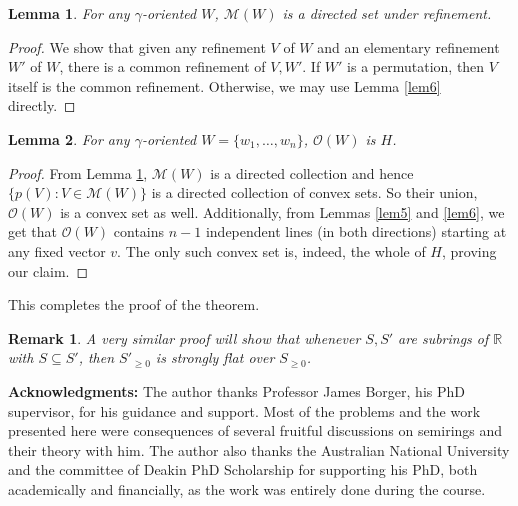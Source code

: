\documentclass[notitlepage, 10pt]{article}
\theoremstyle{defin}
\theoremstyle{theo}
\newtheorem{lem}{Lemma}[defn]
\theoremstyle{rema}
\newtheorem{rem}{Remark}[section]
\newcommand{\R}{\mathbb{R}}
\newcommand{\cM}{\mathcal{M}}
\newcommand{\cO}{\mathcal{O}}
\begin{document}
\begin{lem}
\label{lem7}
    For any $\gamma$-oriented $W$, $\cM(W)$ is a directed set under refinement.
\end{lem}

\begin{proof}
    We show that given any refinement $V$ of $W$ and an elementary refinement $W'$ of $W$, there is a common refinement of $V, W'$. If $W'$ is a permutation, then $V$ itself is the common refinement. Otherwise, we may use Lemma \ref{lem6} directly.
\end{proof}
    
\begin{lem}
\label{lem8}
    For any $\gamma$-oriented $W=\{w_1,\ldots,w_n\}$, $\cO(W)$ is $H$.
\end{lem}

\begin{proof}
    From Lemma \ref{lem7}, $\cM(W)$ is a directed collection and hence $\{p(V) :  V \in \cM(W)\}$ is a directed collection of convex sets. So their union, $\cO(W)$ is a convex set as well. Additionally, from Lemmas \ref{lem5} and \ref{lem6}, we get that $\cO(W)$ contains $n-1$ independent lines (in both directions) starting at any fixed vector $v$. The only such convex set is, indeed, the whole of $H$, proving our claim.
\end{proof}

This completes the proof of the theorem. 

\begin{rem}
    A very similar proof will show that whenever $S, S'$ are subrings of $\R$ with $S\subseteq S'$, then $S'_{\geq 0}$ is strongly flat over $S_{\geq 0}$.
\end{rem}

{\footnotesize \textbf{Acknowledgments:} The author thanks Professor James Borger, his PhD supervisor, for his guidance and support. Most of the problems and the work presented here were consequences of several fruitful discussions on semirings and their theory with him. The author also thanks the Australian National University and the committee of Deakin PhD Scholarship for supporting his PhD, both academically and financially, as the work was entirely done during the course.}




\end{document}
